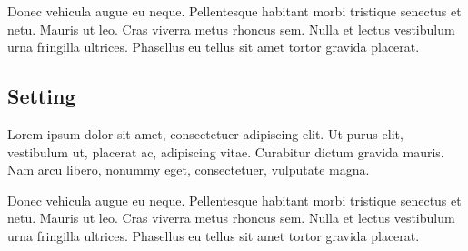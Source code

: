 Donec vehicula augue eu neque.
Pellentesque habitant morbi tristique senectus et netu.
Mauris ut leo.  Cras viverra metus rhoncus sem.
Nulla et lectus vestibulum urna fringilla ultrices.
Phasellus eu tellus sit amet tortor gravida placerat.


\subsection{Setting}

Lorem ipsum dolor sit amet, consectetuer adipiscing elit.
Ut purus elit, vestibulum ut, placerat ac, adipiscing vitae.
Curabitur dictum gravida mauris.
Nam arcu libero, nonummy eget, consectetuer, vulputate magna.

Donec vehicula augue eu neque.
Pellentesque habitant morbi tristique senectus et netu.
Mauris ut leo.  Cras viverra metus rhoncus sem.
Nulla et lectus vestibulum urna fringilla ultrices.
Phasellus eu tellus sit amet tortor gravida placerat.